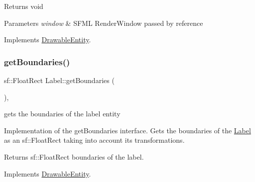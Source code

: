 \begin{DoxyReturn}{Returns}
void 
\end{DoxyReturn}

\begin{DoxyParams}{Parameters}
{\em window} & S\+F\+ML Render\+Window passed by reference \\
\hline
\end{DoxyParams}


Implements \hyperlink{class_drawable_entity_a0b0db9c1325defed216d66a5b4cc755e}{Drawable\+Entity}.

\mbox{\label{class_label_a3eb456d7295b3d5af615b3dc6e761f4b}} 
\subsubsection{\texorpdfstring{get\+Boundaries()}{getBoundaries()}}
{\footnotesize\ttfamily sf\+::\+Float\+Rect Label\+::get\+Boundaries (\begin{DoxyParamCaption}{ }\end{DoxyParamCaption})\hspace{0.3cm}{\ttfamily [override]}, {\ttfamily [virtual]}}



gets the boundaries of the label entity 

Implementation of the get\+Boundaries interface. Gets the boundaries of the \hyperlink{class_label}{Label} as an sf\+::\+Float\+Rect taking into account it\textquotesingle{}s transformations.

\begin{DoxyReturn}{Returns}
sf\+::\+Float\+Rect boundaries of the label. 
\end{DoxyReturn}


Implements \hyperlink{class_drawable_entity_a352a101e3be05d25e1a10e5f72ccb9e3}{Drawable\+Entity}.

\mbox{\label{class_label_ab69dd0268124ac21d55b87734fd282a0}} 
